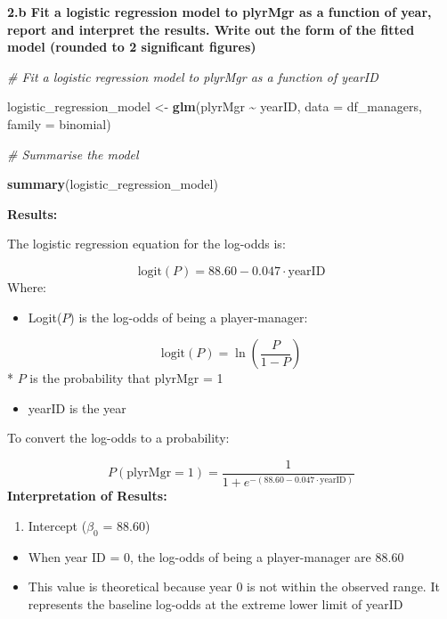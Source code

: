 \documentclass[
]{article}
\newenvironment{Shaded}{\begin{snugshade}}{\end{snugshade}}
\newcommand{\AttributeTok}[1]{\textcolor[rgb]{0.13,0.29,0.53}{#1}}
\newcommand{\CommentTok}[1]{\textcolor[rgb]{0.56,0.35,0.01}{\textit{#1}}}
\newcommand{\FunctionTok}[1]{\textcolor[rgb]{0.13,0.29,0.53}{\textbf{#1}}}
\newcommand{\NormalTok}[1]{#1}
\newcommand{\OtherTok}[1]{\textcolor[rgb]{0.56,0.35,0.01}{#1}}
\newcommand{\SpecialCharTok}[1]{\textcolor[rgb]{0.81,0.36,0.00}{\textbf{#1}}}
\providecommand{\tightlist}{%
  \setlength{\itemsep}{0pt}\setlength{\parskip}{0pt}}
\begin{document}
\textbf{2.b Fit a logistic regression model to plyrMgr as a function of
year, report and interpret the results. Write out the form of the fitted
model (rounded to 2 significant figures)}

\begin{Shaded}
\begin{Highlighting}[]
\CommentTok{\# Fit a logistic regression model to plyrMgr as a function of yearID}

\NormalTok{logistic\_regression\_model }\OtherTok{\textless{}{-}} \FunctionTok{glm}\NormalTok{(plyrMgr }\SpecialCharTok{\textasciitilde{}}\NormalTok{ yearID, }\AttributeTok{data =}\NormalTok{ df\_managers, }\AttributeTok{family =}\NormalTok{ binomial)}

\CommentTok{\# Summarise the model}

\FunctionTok{summary}\NormalTok{(logistic\_regression\_model)}
\end{Highlighting}
\end{Shaded}

\textbf{Results:}

The logistic regression equation for the log-odds is:

\[
\text{logit}(P) = 88.60 - 0.047 \cdot \text{yearID}
\] Where:

\begin{itemize}
\tightlist
\item
  Logit(\(P\)) is the log-odds of being a player-manager:
\end{itemize}

\[
\text{logit}(P) = \ln\left(\frac{P}{1-P}\right)
\] * \(P\) is the probability that plyrMgr = 1

\begin{itemize}
\tightlist
\item
  yearID is the year
\end{itemize}

To convert the log-odds to a probability:

\[
P(\text{plyrMgr} = 1) = \frac{1}{1 + e^{-(88.60 - 0.047 \cdot \text{yearID})}}
\] \textbf{Interpretation of Results:}

\begin{enumerate}
\def\labelenumi{\arabic{enumi}.}
\tightlist
\item
  Intercept (\(\beta_{0}\) = 88.60)
\end{enumerate}

\begin{itemize}
\item
  When year ID = 0, the log-odds of being a player-manager are 88.60
\item
  This value is theoretical because year 0 is not within the observed
  range. It represents the baseline log-odds at the extreme lower limit
  of yearID
\end{itemize}
\end{document}
